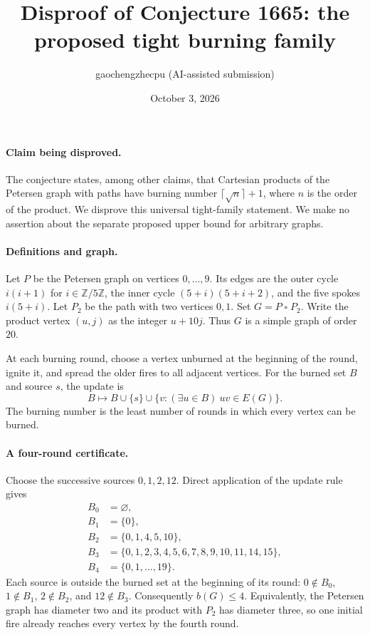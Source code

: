 \documentclass[10pt]{article}
\title{Disproof of Conjecture 1665: the proposed tight burning family}
\author{gaochengzhecpu (AI-assisted submission)}
\date{October 3, 2026}
\makeatletter
\renewcommand{\maketitle}{\begin{center}
{\Large\bfseries\@title\par}\vspace{0.6em}
{\small\@author\par\@date}
\end{center}\vspace{0.5em}}
\makeatother
\begin{document}
\maketitle

\paragraph{Claim being disproved.}
The conjecture states, among other claims, that Cartesian products of the
Petersen graph with paths have burning number
$\lceil\sqrt{n}\rceil+1$, where $n$ is the order of the product.
We disprove this universal tight-family statement. We make no assertion
about the separate proposed upper bound for arbitrary graphs.

\paragraph{Definitions and graph.}
Let $P$ be the Petersen graph on vertices $0,\ldots,9$. Its edges are
the outer cycle $i(i+1)$ for $i\in\mathbb Z/5\mathbb Z$, the inner
cycle $(5+i)(5+i+2)$, and the five spokes $i(5+i)$.
Let $P_2$ be the path with two vertices $0,1$. Set $G=P\mathbin\square P_2$.
Write the product vertex $(u,j)$ as the integer $u+10j$.
Thus $G$ is a simple graph of order $20$.

At each burning round, choose a vertex unburned at the beginning of the
round, ignite it, and spread the older fires to all adjacent vertices.
For the burned set $B$ and source $s$, the update is
\[
 B\longmapsto B\cup\{s\}\cup\{v: (\exists u\in B)\ uv\in E(G)\}.
\]
The burning number is the least number of rounds in which every vertex
can be burned.

\paragraph{A four-round certificate.}
Choose the successive sources $0,1,2,12$. Direct application of the
update rule gives
\begin{align*}
 B_0&=\varnothing,\\
 B_1&=\{0\},\\
 B_2&=\{0,1,4,5,10\},\\
 B_3&=\{0,1,2,3,4,5,6,7,8,9,10,11,14,15\},\\
 B_4&=\{0,1,\ldots,19\}.
\end{align*}
Each source is outside the burned set at the beginning of its round:
$0\notin B_0$, $1\notin B_1$, $2\notin B_2$, and $12\notin B_3$.
Consequently $b(G)\leq4$.
Equivalently, the Petersen graph has diameter two and its product with
$P_2$ has diameter three, so one initial fire already reaches every
vertex by the fourth round.
\end{document}
